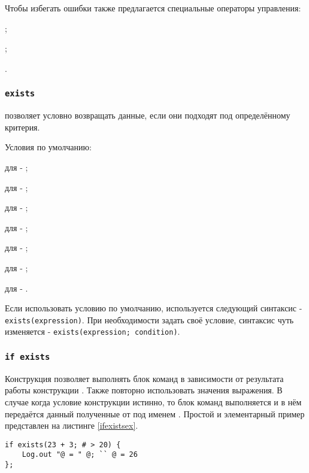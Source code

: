 Чтобы избегать ошибки также предлагается специальные операторы управления:
\begin{icItems}
	\item {};
	\item {};
	\item {}.
\end{icItems}

\subsubsection{\lstinline|exists|}

 позволяет условно возвращать данные, если они подходят под определённому критерия.

Условия по умолчанию:
\begin{icItems}
	\item
	для \bool{} - ;
	\item
	для \integer{} - ;
	\item
	для \double{} - ;
	\item
	для \str{} - ;
	\item
	для \listtype{} - ;
	\item
	для \set{} - ;
	\item
	для \element{} - .
\end{icItems}

Если использовать условию по умолчанию, используется следующий синтаксис - \lstinline|exists(expression)|.
При необходимости задать своё условие, синтаксис чуть изменяется - \lstinline|exists(expression; condition)|.

\subsubsection{\lstinline|if exists|}

Конструкция  позволяет выполнять блок команд в зависимости от результата работы конструкции . Также повторно использовать значения выражения. В случае когда условие конструкции  истинно, то блок команд выполняется и в нём передаётся данный полученные от  под именем .
Простой и элементарный пример представлен на листинге \ref{ifexistsex}.

\begin{lstlisting}[caption=Использование if exist, label=ifexistsex]
if exists(23 + 3; # > 20) {
	Log.out "@ = " @; `` @ = 26
};
\end{lstlisting}

